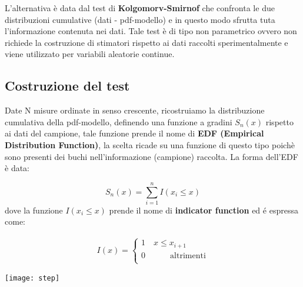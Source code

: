 \documentclass[11pt,a4paper]{book}
\begin{document}
L'alternativa \`{e} data dal test di \textbf{Kolgomorv-Smirnof} che confronta le due distribuzioni cumulative (dati - pdf-modello) e in questo modo sfrutta tuta l'informazione contenuta nei dati. Tale test \`{e} di tipo non parametrico ovvero non richiede la costruzione di stimatori rispetto ai dati raccolti sperimentalmente e viene utilizzato per variabili aleatorie continue. 


\subsection{Costruzione del test}

Date N misure ordinate in senso crescente, ricostruiamo la distribuzione cumulativa della pdf-modello, definendo una funzione a gradini $S_n (x)$ rispetto ai dati del campione, tale funzione prende il nome di \textbf{EDF (Empirical Distribution Function)}, la scelta ricade su una funzione di questo tipo poich\`{e} sono presenti dei buchi nell'informazione (campione) raccolta. La forma dell'EDF \`{e} data:

\begin{equation}
	S_n(x) = \sum_{i=1}^nI(x_i \leq x)  
\end{equation}
dove la funzione $I(x_i \leq x)$ prende il nome di \textbf{indicator function} ed \'{e} espressa come:

\vspace{0.2in}

\begin{minipage}{.4\textwidth}
	\begin{align*}
I(x) = 
	\begin{cases}
	1 \quad x \leq x_{i+1} \\
	0 \quad \quad \quad \text{altrimenti}\\
	\end{cases}
\end{align*}
  \end{minipage}
  \begin{minipage}{.4\textwidth}
    \centering
    \texttt{[image: step]}	
  \end{minipage}
\vspace{0.2in}
\end{document}
